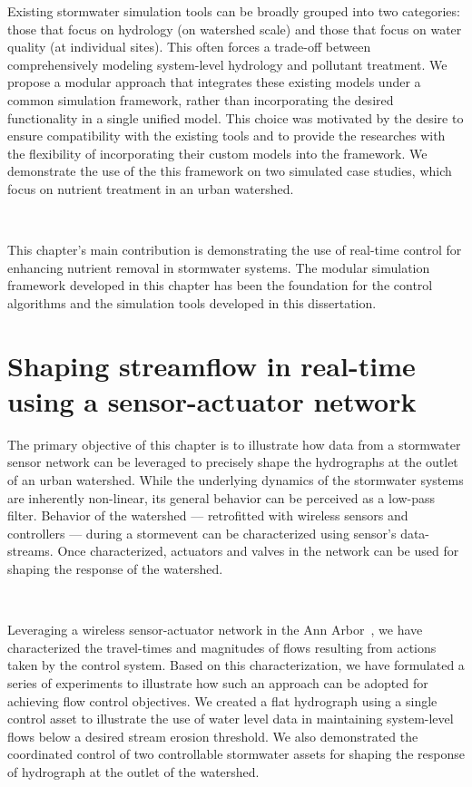 Existing stormwater simulation tools can be broadly grouped into two categories: those that focus on hydrology (on watershed scale) and those that focus on water quality (at individual sites).
This often forces a trade-off between comprehensively modeling system-level hydrology and pollutant treatment.
We propose a modular approach that integrates these existing models under a common simulation framework, rather than incorporating the desired functionality in a single unified model.
This choice was motivated by the desire to ensure compatibility with the existing tools and to provide the researches with the flexibility of incorporating their custom models into the framework.
We demonstrate the use of the this framework on two simulated case studies, which focus on nutrient treatment in an urban watershed.

\

This chapter's main contribution is demonstrating the use of real-time control for enhancing nutrient removal in stormwater systems. The modular simulation framework developed in this chapter has been the foundation for the control algorithms and the simulation tools developed in this dissertation. 

\section{Shaping streamflow in real-time using a sensor-actuator network}

The primary objective of this chapter is to illustrate how data from a stormwater sensor network can be leveraged to precisely shape the hydrographs at the outlet of an urban watershed.
While the underlying dynamics of the stormwater systems are inherently non-linear, its general behavior can be perceived as a low-pass filter.
Behavior of the watershed --- retrofitted with wireless sensors and controllers --- during a stormevent can be characterized using sensor's data-streams.
Once characterized, actuators and valves in the network can be used for shaping the response of the watershed.

\

Leveraging a wireless sensor-actuator network in the Ann Arbor~\cite{Bartos_2018}, we have characterized the travel-times and magnitudes of flows resulting from actions taken by the control system.
Based on this characterization, we have formulated a series of experiments to illustrate how such an approach can be adopted for achieving flow control objectives.
We created a flat hydrograph using a single control asset to illustrate the use of water level data in maintaining system-level flows below a desired stream erosion threshold.
We also demonstrated the coordinated control of two controllable stormwater assets for shaping the response of hydrograph at the outlet of the watershed.

